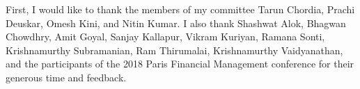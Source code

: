 First, I would like to thank the members of my committee Tarun Chordia, Prachi Deuskar, Omesh Kini, and Nitin Kumar. I also thank Shashwat Alok, Bhagwan Chowdhry, Amit Goyal, Sanjay Kallapur, Vikram Kuriyan, Ramana Sonti, Krishnamurthy Subramanian, Ram Thirumalai, Krishnamurthy Vaidyanathan, and the participants of the 2018 Paris Financial Management conference for their generous time and feedback.